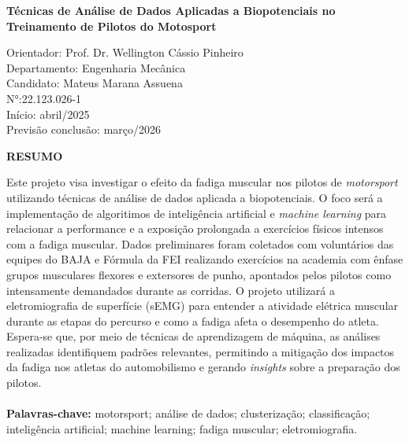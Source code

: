 \documentclass[symbols]{fei}
\begin{document}
\vspace*{\fill} %
\begin{center}
{\LARGE \textbf{Técnicas de Análise de Dados Aplicadas a Biopotenciais no Treinamento de Pilotos do Motosport}} %
\end{center}
\vspace{6cm}%
Orientador: Prof. Dr. Wellington Cássio Pinheiro \\
Departamento: Engenharia Mecânica \\
Candidato: Mateus Marana Assuena\\
N°:22.123.026-1 
\vspace{2cm} \\ %
Início: abril/2025 \\
Previsão conclusão:  março/2026
\vspace*{\fill} %

\newpage

\begin{center}
    \textbf{RESUMO}
\end{center}

Este projeto visa investigar o efeito da fadiga muscular nos pilotos de \textit{motorsport} utilizando técnicas de análise de dados 
aplicada a biopotenciais. O foco será a implementação de algoritimos de inteligência artificial e \textit{machine learning} para 
relacionar a performance e a exposição prolongada a exercícios físicos intensos com a fadiga muscular. Dados preliminares foram coletados com voluntários das 
equipes do BAJA e Fórmula da FEI realizando exercícios na academia com ênfase grupos musculares flexores e extersores de punho, apontados pelos pilotos
como intensamente demandados durante as corridas. 
O projeto utilizará a eletromiografia de superfície (sEMG) para entender a atividade elétrica muscular durante as etapas do percurso e como a fadiga afeta o desempenho do atleta. 
Espera-se que, por meio de técnicas de aprendizagem de máquina, as análises realizadas identifiquem padrões relevantes, permitindo a mitigação dos impactos da fadiga nos atletas do automobilismo e gerando \textit{insights}
sobre a preparação dos pilotos.\\
\\
\textbf{Palavras-chave:} motorsport; análise de dados; clusterização; classificação; inteligência artificial; machine learning; fadiga muscular; eletromiografia.
\end{document}
